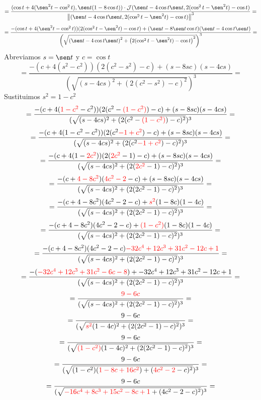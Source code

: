 \documentclass{article}
\begin{document}
$$
= \frac{(\cos t + 4(\sen^2 t - \cos^2 t), \sen t(1 - 8 \cos t)) \cdot \mathcal{J}(\sen t - 4 \cos t \sen t, 2(\cos^2 t -\sen^2 t)-\cos t)}{\left\| (\sen t - 4 \cos t \sen t, 2(\cos^2 t -\sen^2 t)-\cos t) \right\|^3} =
$$
$$
= \frac{{-(\cos t + 4(\sen^2 t - \cos^2 t)) (2(\cos^2 t -\sen^2 t)-\cos t) + (\sen t - 8\sen t \cos t) (\sen t - 4 \cos t \sen t)}}{{\left(\sqrt{\left( \sen t - 4 \cos t \sen t \right)^2+\left( 2(\cos^2 t -\sen^2 t)-\cos t \right)^2}\right)^3}} =
$$
Abreviamos $s = \sen t$ y $c = \cos t$
$$
= \frac{{-(c  + 4(s^2  - c^2 )) (2(c^2  -s^2 )-c ) + (s  - 8s  c ) (s  - 4 c  s )}}{{(\sqrt{( s  - 4 c  s  )^2+( 2(c^2  -s^2 )-c  )^2})^3}} =
$$
Sustituimos $s^2 = 1-c^2$
$$
= \frac{{-(c  + 4(\textcolor{red}{1-c^2}  - c^2 )) (2(c^2  -\textcolor{red}{(1-c^2)} )-c ) + (s  - 8s  c ) (s  - 4 c  s )}}{{(\sqrt{( s  - 4 c  s  )^2+( 2(c^2  -\textcolor{red}{(1-c^2)} )-c  )^2})^3}} =
$$
$$
= \frac{{-(c  + 4( 1-c^2 - c^2 )) (2(c^2  \textcolor{red}{-1+c^2} )-c ) + (s  - 8s  c ) (s  - 4 c  s )}}{{(\sqrt{( s  - 4 c  s  )^2+( 2(c^2 \textcolor{red}{-1+c^2} )-c  )^2})^3}} =
$$
$$
= \frac{{-(c  + 4( 1-\textcolor{red}{2c^2} )) (2(\textcolor{red}{2c^2}  -1 )-c ) + (s  - 8s  c ) (s  - 4 c  s )}}{{(\sqrt{( s  - 4 c  s  )^2+( 2(\textcolor{red}{2c^2}  -1 )-c  )^2})^3}} =
$$
$$
= \frac{{-(c  +\textcolor{red}{ 4 - 8c^2 }) (\textcolor{red}{4c^2 - 2} - c ) + (s  - 8s  c ) (s  - 4 c  s )}}{{(\sqrt{( s  - 4 c  s  )^2+( 2(2c^2  -1 )-c  )^2})^3}} =
$$
$$
= \frac{{-(c  + 4 - 8c^2 ) (4c^2 - 2 - c ) + \textcolor{red}{s^2}(1 - 8 c ) (1 - 4 c )}}{{(\sqrt{( s  - 4 c  s  )^2+( 2(2c^2  -1 )-c  )^2})^3}} =
$$
$$
= \frac{{-(c  + 4 - 8c^2 ) (4c^2 - 2 - c ) + \textcolor{red}{(1-c^2)}(1 - 8 c ) (1 - 4 c )}}{{(\sqrt{( s  - 4 c  s  )^2+( 2(2c^2  -1 )-c  )^2})^3}} =
$$
$$
= \frac{{-(c  + 4 - 8c^2 ) (4c^2 - 2 - c ) \textcolor{red}{-32 c^4 + 12 c^3 + 31 c^2 - 12 c + 1}}}{{(\sqrt{( s  - 4 c  s  )^2+( 2(2c^2  -1 )-c  )^2})^3}} =
$$
$$
= \frac{{-(\textcolor{red}{-32 c^4 + 12 c^3 + 31 c^2 - 6 c - 8}) + -32 c^4 + 12 c^3 + 31 c^2 - 12 c + 1}}{{(\sqrt{( s  - 4 c  s  )^2+( 2(2c^2  -1 )-c  )^2})^3}} =
$$
$$
= \frac{\textcolor{red}{9-6c}}{{(\sqrt{( s  - 4 c  s  )^2+( 2(2c^2  -1 )-c  )^2})^3}} =
$$
$$
= \frac{9-6c}{{(\sqrt{\textcolor{red}{s^2}( 1 - 4 c )^2+( 2(2c^2  -1 )-c  )^2})^3}} =
$$
$$
= \frac{9-6c}{{(\sqrt{\textcolor{red}{(1 - c^2)}( 1 - 4 c )^2+( 2(2c^2  -1 )-c  )^2})^3}} =
$$
$$
= \frac{9-6c}{{(\sqrt{(1 - c^2)( \textcolor{red}{1 - 8c +16c^2} )+( \textcolor{red}{4c^2 - 2} - c )^2})^3}} =
$$
$$
= \frac{9-6c}{{(\sqrt{\textcolor{red}{-16 c^4 + 8 c^3 + 15 c^2 - 8 c + 1} +( 4c^2 - 2 - c )^2})^3}} =
$$
\end{document}
